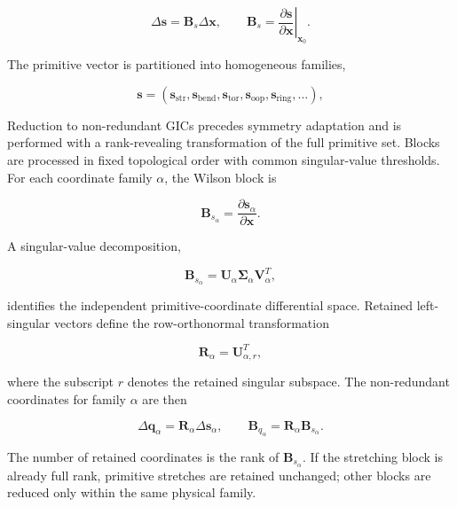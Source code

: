 \documentclass[journal=jctcce,manuscript=article,maxauthors=999]{achemso}
\begin{document}
\begin{equation}
\Delta \mathbf{s}
=
\mathbf{B}_s
\Delta \mathbf{x},
\qquad
\mathbf{B}_s =
\left.
\frac{\partial \mathbf{s}}
{\partial \mathbf{x}}
\right|_{\mathbf{x}_0}.
\end{equation}

The primitive vector is partitioned into homogeneous families,

\begin{equation}
\mathbf{s}
=
\left(
\mathbf{s}_{\mathrm{str}},
\mathbf{s}_{\mathrm{bend}},
\mathbf{s}_{\mathrm{tor}},
\mathbf{s}_{\mathrm{oop}},
\mathbf{s}_{\mathrm{ring}},
\ldots
\right),
\end{equation}

Reduction to non-redundant GICs precedes symmetry adaptation and is performed
with a rank-revealing transformation of the full primitive set. Blocks are
processed in fixed topological order with common singular-value thresholds.
For each coordinate family $\alpha$, the Wilson block is

\begin{equation}
\mathbf{B}_{s_\alpha}
=
\frac{\partial\mathbf{s}_\alpha}
{\partial\mathbf{x}} .
\end{equation}

A singular-value decomposition,\cite{GolubReinsch1970}

\begin{equation}
\mathbf{B}_{s_\alpha}
=
\mathbf{U}_{\alpha}
\boldsymbol{\Sigma}_{\alpha}
\mathbf{V}_{\alpha}^{T},
\end{equation}

identifies the independent primitive-coordinate differential space. Retained
left-singular vectors define the row-orthonormal transformation

\begin{equation}
\mathbf{R}_{\alpha}
=
\mathbf{U}_{\alpha,r}^{T},
\end{equation}

where the subscript $r$ denotes the retained singular subspace. The
non-redundant coordinates for family $\alpha$ are then

\begin{equation}
\Delta \mathbf{q}_\alpha
=
\mathbf{R}_\alpha
\Delta \mathbf{s}_\alpha ,
\qquad
\mathbf{B}_{q_\alpha}
=
\mathbf{R}_\alpha
\mathbf{B}_{s_\alpha}.
\end{equation}

The number of retained coordinates is the rank of
$\mathbf{B}_{s_\alpha}$. If the stretching block is already full rank,
primitive stretches are retained unchanged; other blocks are reduced only
within the same physical family.
\end{document}
